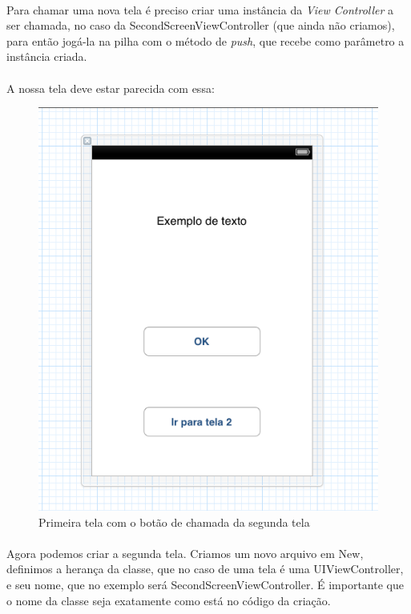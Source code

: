 \documentclass[a4paper,12pt,brazil,doubleside]{book}
\begin{document}
\bigskip

\paragraph{}Para chamar uma nova tela é preciso criar uma instância da \emph{View Controller} a ser chamada, no caso da SecondScreenViewController (que ainda não criamos), para então jogá-la na pilha com o método de \emph{push}, que recebe como parâmetro a instância criada.
\paragraph{}A nossa tela deve estar parecida com essa:

\begin{figure}[h]
  \centering
  \includegraphics[totalheight=0.3\textheight]{../figuras/ios/1/simulador3_tela1.png}
  \caption{Primeira tela com o botão de chamada da segunda tela}
  \label{fig:a}
\end{figure}

\bigskip

\paragraph{}Agora podemos criar a segunda tela. Criamos um novo arquivo em New, definimos a herança da classe, que no caso de uma tela é uma UIViewController, e seu nome, que no exemplo será SecondScreenViewController. É importante que o nome da classe seja exatamente como está no código da criação.
\end{document}
